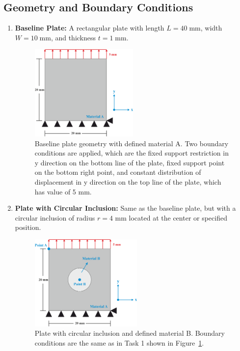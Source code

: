 \documentclass[12pt]{article}
\begin{document}
\subsection{Geometry and Boundary Conditions}
\begin{enumerate}
     \item \textbf{Baseline Plate:} A rectangular plate with length $L = 40 \;\text{mm}$, width $W = 10 \;\text{mm}$, and thickness $t = 1 \;\text{mm}$.
        \begin{figure}[H]
        \centering
            \includegraphics[width=0.5\textwidth]{images/TaskQ1.png}
        \caption{Baseline plate geometry with defined material A. Two boundary conditions are applied, which are the 
        fixed support restriction in y direction on the bottom line of the plate, fixed support point on the bottom right point,
        and constant distribution of displacement in y direction on the top line of the plate, which has value of 5 mm.}
        \label{fig:geometryQ1}
\end{figure}

    \item \textbf{Plate with Circular Inclusion:} Same as the baseline plate, but with a circular inclusion of radius $r=4$ mm located at the center or specified position.
\begin{figure}[H]
        \centering
            \includegraphics[width=0.52\textwidth]{images/TaskQ2.png}
        \caption{Plate with circular inclusion and defined material B. Boundary conditions are the same as in Task 1 shown in Figure~\ref{fig:geometryQ1}.}
        \label{fig:geometryQ2}
\end{figure}
\end{enumerate}
\end{document}
